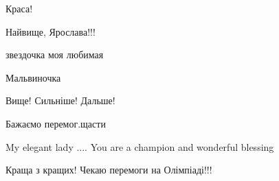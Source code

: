 \begin{itemize}
Краса!

 
Найвище, Ярослава!!!

 
звездочка моя любимая

 
Мальвиночка

 
Вище! Сильніше! Дальше!

 
Бажаємо перемог.щасти

 

My elegant lady .... You are a champion and wonderful blessing

 
Краща з кращих! Чекаю перемоги на Олімпіаді!!!


\end{itemize}
